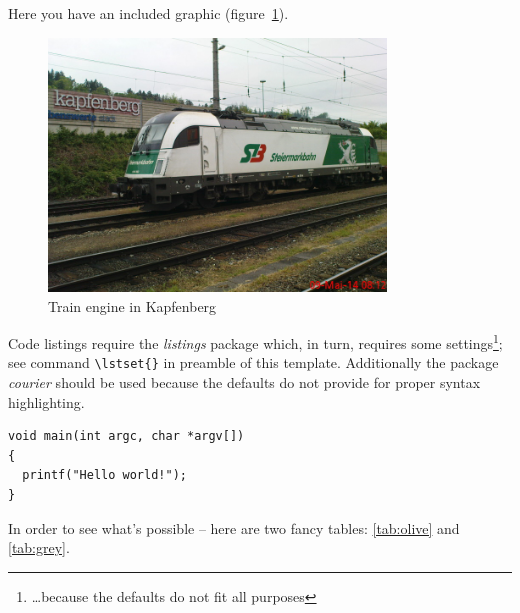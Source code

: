 Here you have an included graphic (figure~\ref{fig:engine}).

\begin{figure}[h]
\centering
\includegraphics[keepaspectratio,width=0.8\textwidth]
{images/engine}
\caption{Train engine in Kapfenberg}
\label{fig:engine}
\end{figure}

Code listings require the \textit{listings} package which, in turn, requires some settings\footnote{\ldots because the defaults do not fit all purposes}; see command \verb+\lstset{}+ in preamble of this template. Additionally the package \textit{courier} should be used because the defaults do not provide for proper syntax highlighting.

\lstset{caption=Main programme, basicstyle=\small\ttfamily, label=lst:main, language=C}
\begin{lstlisting}
void main(int argc, char *argv[])
{
  printf("Hello world!");
}
\end{lstlisting}

In order to see what's possible -- here are two fancy tables: \ref{tab:olive} and \ref{tab:grey}.

